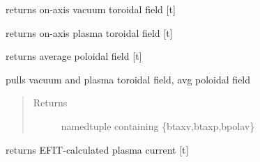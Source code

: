 \documentclass[letterpaper,10pt,english]{sphinxmanual}
\begin{document}
\begin{fulllineitems}
\begin{fulllineitems}
\begin{quote}
\begin{description}
\end{description}\end{quote}

\end{fulllineitems}


\begin{fulllineitems}
\label{eqtools:eqtools.EFIT.EFITTree.getBtVac}
returns on-axis vacuum toroidal field {[}t{]}

\end{fulllineitems}


\begin{fulllineitems}
\label{eqtools:eqtools.EFIT.EFITTree.getBtPla}
returns on-axis plasma toroidal field {[}t{]}

\end{fulllineitems}


\begin{fulllineitems}
\label{eqtools:eqtools.EFIT.EFITTree.getBpAvg}
returns average poloidal field {[}t{]}

\end{fulllineitems}


\begin{fulllineitems}
\label{eqtools:eqtools.EFIT.EFITTree.getFields}
pulls vacuum and plasma toroidal field, avg poloidal field
\begin{quote}\begin{description}
\item[{Returns}] \leavevmode
namedtuple containing \{btaxv,btaxp,bpolav\}

\end{description}\end{quote}

\end{fulllineitems}


\begin{fulllineitems}
\label{eqtools:eqtools.EFIT.EFITTree.getIpCalc}
returns EFIT-calculated plasma current {[}t{]}


\end{fulllineitems}
\end{fulllineitems}
\end{document}
